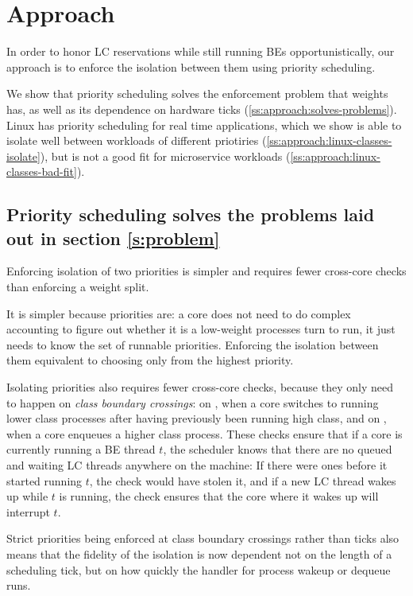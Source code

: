 \section{Approach}\label{s:approach}

In order to honor LC reservations while still running BEs opportunistically, our
approach is to enforce the isolation between them using priority scheduling.

We show that priority scheduling solves the enforcement problem that weights
has, as well as its dependence on hardware ticks
(\autoref{ss:approach:solves-problems}). Linux has priority scheduling for real
time applications, which we show is able to isolate well between workloads of
different priotiries (\autoref{ss:approach:linux-classes-isolate}), but is not a
good fit for microservice workloads
(\autoref{ss:approach:linux-classes-bad-fit}).

\subsection{Priority scheduling solves the problems laid out in section
\ref{s:problem}}\label{ss:approach:solves-problems}

Enforcing isolation of two priorities is simpler and requires fewer cross-core
checks than enforcing a weight split. 

It is simpler because priorities are: a core does not need to do complex
accounting to figure out whether it is a low-weight processes turn to run, it
just needs to know the set of runnable priorities. Enforcing the isolation
between them equivalent to choosing only from the highest priority.

Isolating priorities also requires fewer cross-core checks, because they only
need to happen on \textit{class boundary crossings}: on \exit{}, when a core
switches to running lower class processes after having previously been running
high class, and on \entry{}, when a core enqueues a higher class process. These
checks ensure that if a core is currently running a BE thread $t$, the scheduler
knows that there are no queued and waiting LC threads anywhere on the machine:
If there were ones before it started running $t$, the \exit{} check would have
stolen it, and if a new LC thread wakes up while $t$ is running, the \entry{}
check ensures that the core where it wakes up will interrupt $t$.

Strict priorities being enforced at class boundary crossings rather than ticks
also means that the fidelity of the isolation is now dependent not on the length of a
scheduling tick, but on how quickly the handler for process wakeup or dequeue runs.


